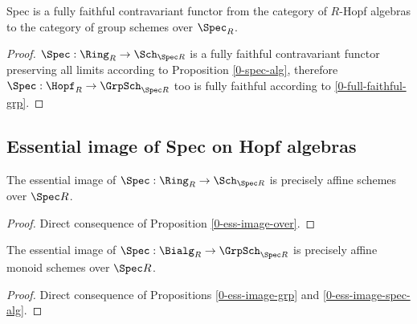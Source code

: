 \begin{proposition}
  \label{0-full-faithful-spec-hopf}
  \leanok

  Spec is a fully faithful contravariant functor from the category of $R$-Hopf algebras to the category of group schemes over $\Spec_R$.
\end{proposition}
\begin{proof}
  \leanok

  $\Spec : \Ring_R \to \Sch_{\Spec R}$ is a fully faithful contravariant functor
  preserving all limits according to Proposition \ref{0-spec-alg},
  therefore $\Spec : \Hopf_R \to \GrpSch_{\Spec R}$ too is fully faithful
  according to \ref{0-full-faithful-grp}.
\end{proof}


\subsection{Essential image of Spec on Hopf algebras}


\begin{proposition}
  \label{0-ess-image-spec-alg}
  \leanok

  The essential image of $\Spec : \Ring_R \to \Sch_{\Spec R}$ is precisely
  affine schemes over $\Spec R$.
\end{proposition}
\begin{proof}
  \leanok

  Direct consequence of Proposition \ref{0-ess-image-over}.
\end{proof}


\begin{proposition}
  \label{0-ess-image-spec-bialg}
  \leanok

  The essential image of $\Spec : \Bialg_R \to \GrpSch_{\Spec R}$ is precisely
  affine monoid schemes over $\Spec R$.
\end{proposition}
\begin{proof}
  \leanok

  Direct consequence of Propositions \ref{0-ess-image-grp} and \ref{0-ess-image-spec-alg}.
\end{proof}


